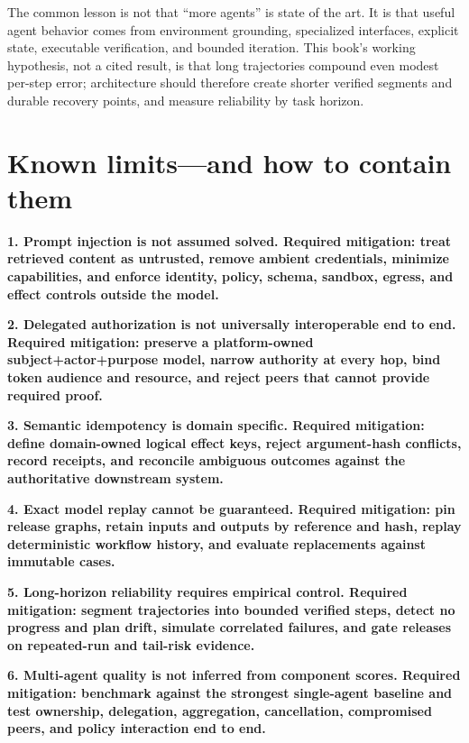 The common lesson is not that “more agents” is state of the art. It is that useful agent behavior comes from environment grounding, specialized interfaces, explicit state, executable verification, and bounded iteration. This book's working hypothesis, not a cited result, is that long trajectories compound even modest per-step error; architecture should therefore create shorter verified segments and durable recovery points, and measure reliability by task horizon.\par


\section{Known limits—and how to contain them}

\textbf{1. Prompt injection is not assumed solved. Required mitigation: treat retrieved content as untrusted, remove ambient credentials, minimize capabilities, and enforce identity, policy, schema, sandbox, egress, and effect controls outside the model.}\par

\textbf{2. Delegated authorization is not universally interoperable end to end. Required mitigation: preserve a platform-owned subject+actor+purpose model, narrow authority at every hop, bind token audience and resource, and reject peers that cannot provide required proof.}\par

\textbf{3. Semantic idempotency is domain specific. Required mitigation: define domain-owned logical effect keys, reject argument-hash conflicts, record receipts, and reconcile ambiguous outcomes against the authoritative downstream system.}\par

\textbf{4. Exact model replay cannot be guaranteed. Required mitigation: pin release graphs, retain inputs and outputs by reference and hash, replay deterministic workflow history, and evaluate replacements against immutable cases.}\par

\textbf{5. Long-horizon reliability requires empirical control. Required mitigation: segment trajectories into bounded verified steps, detect no progress and plan drift, simulate correlated failures, and gate releases on repeated-run and tail-risk evidence.}\par

\textbf{6. Multi-agent quality is not inferred from component scores. Required mitigation: benchmark against the strongest single-agent baseline and test ownership, delegation, aggregation, cancellation, compromised peers, and policy interaction end to end.}\par

